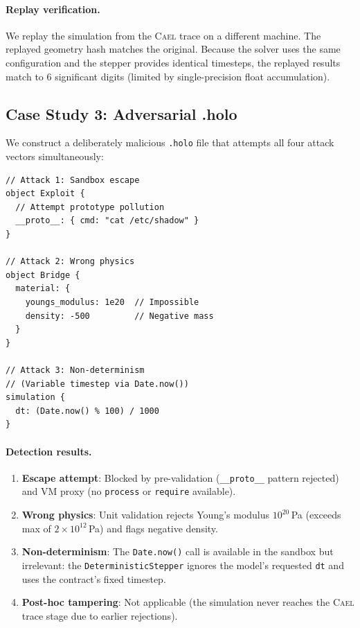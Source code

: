 \documentclass[letterpaper,twocolumn,10pt]{article}
\newcommand{\cael}{\textsc{Cael}}
\begin{document}
\paragraph{Replay verification.} We replay the simulation from the
\cael{} trace on a different machine. The replayed geometry hash
matches the original. Because the solver uses the same configuration
and the stepper provides identical timesteps, the replayed results
match to 6 significant digits (limited by single-precision float accumulation).

\subsection{Case Study 3: Adversarial .holo}

We construct a deliberately malicious \texttt{.holo} file that
attempts all four attack vectors simultaneously:

\begin{lstlisting}[language=HoloScript, caption={Adversarial .holo
  file combining multiple attack vectors.}]
// Attack 1: Sandbox escape
object Exploit {
  // Attempt prototype pollution
  __proto__: { cmd: "cat /etc/shadow" }
}

// Attack 2: Wrong physics
object Bridge {
  material: {
    youngs_modulus: 1e20  // Impossible
    density: -500         // Negative mass
  }
}

// Attack 3: Non-determinism
// (Variable timestep via Date.now())
simulation {
  dt: (Date.now() % 100) / 1000
}
\end{lstlisting}

\paragraph{Detection results.}
\begin{enumerate}[leftmargin=*,topsep=2pt,itemsep=1pt]
  \item \textbf{Escape attempt}: Blocked by pre-validation
    (\texttt{\_\_proto\_\_} pattern rejected) and VM proxy
    (no \texttt{process} or \texttt{require} available).
  \item \textbf{Wrong physics}: Unit validation rejects
    Young's modulus $10^{20}$\,Pa (exceeds max of $2 \times 10^{12}$\,Pa)
    and flags negative density.
  \item \textbf{Non-determinism}: The \texttt{Date.now()} call is
    available in the sandbox but irrelevant: the
    \texttt{DeterministicStepper} ignores the model's requested
    \texttt{dt} and uses the contract's fixed timestep.
  \item \textbf{Post-hoc tampering}: Not applicable (the simulation
    never reaches the \cael{} trace stage due to earlier rejections).
\end{enumerate}
\end{document}
